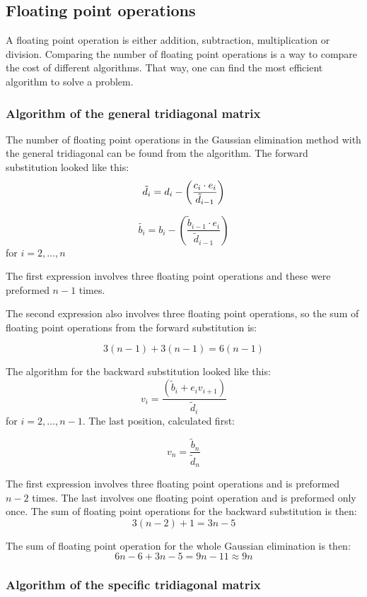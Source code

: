 \subsection{Floating point operations}\label{section:FLOPS}

A floating point operation is either addition, subtraction, multiplication or division. Comparing the number of floating point operations is a way to compare the cost of different algorithms. That way, one can find the most efficient algorithm to solve a problem.

\subsubsection{Algorithm of the general tridiagonal matrix}

The number of floating point operations in the Gaussian elimination method with the general tridiagonal can be found from the algorithm. The forward substitution looked like this:
\[
\tilde{d_i} =  d_i - \left(\frac{c_i \cdot e_i}{\tilde{d}_{i-1}}\right)\linebreak
\]

\[
\tilde{b_i} =  b_i - \left(\frac{\tilde{b}_{i-1} \cdot e_i}{\tilde{d}_{i-1}}\right)
\]
for $i = 2, \dots, n $

The first expression involves three floating point operations and these were preformed $n-1$ times.

The second expression also involves three floating point operations, so the sum of floating point operations from the forward substitution is:

\[
3(n-1)+3(n-1) = 6(n-1)
\]

The algorithm for the backward substitution looked like this:
\[
v_i = \frac{\left(\tilde{b}_i + e_i v_{i+1}\right)}{\tilde{d}_i}
\]
for $i = 2, \dots, n-1 $. The last position, calculated first:

\[
v_{n} = \frac{\tilde{b}_{n}}{\tilde{d}_{n}}
\]

The first expression involves three floating point operations and is preformed $n-2$ times. The last involves one floating point operation and is preformed only once. The sum of floating point operations for the backward substitution is then:
\[
3(n-2) + 1 = 3n - 5
\]

The sum of floating point operation for the whole Gaussian elimination is then:
\[
6n - 6 + 3n - 5 = 9n - 11 \approx 9n
\]

\subsubsection{Algorithm of the specific tridiagonal matrix}


